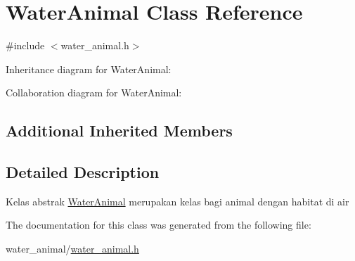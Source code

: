 \hypertarget{classWaterAnimal}{}\section{Water\+Animal Class Reference}
\label{classWaterAnimal}


{\ttfamily \#include $<$water\+\_\+animal.\+h$>$}



Inheritance diagram for Water\+Animal\+:


Collaboration diagram for Water\+Animal\+:
\subsection*{Additional Inherited Members}


\subsection{Detailed Description}
Kelas abstrak \hyperlink{classWaterAnimal}{Water\+Animal} merupakan kelas bagi animal dengan habitat di air 

The documentation for this class was generated from the following file\+:\begin{DoxyCompactItemize}
\item 
water\+\_\+animal/\hyperlink{water__animal_8h}{water\+\_\+animal.\+h}\end{DoxyCompactItemize}
